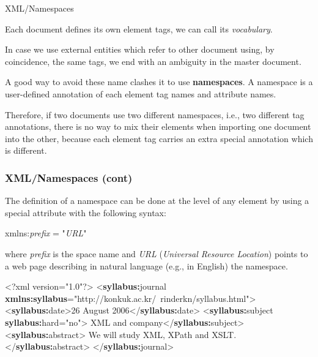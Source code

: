 %
\begin{frame}{XML/Namespaces}

Each \XML document defines its own element tags, we can call its
\emph{vocabulary}.

\bigskip

In case we use external entities which refer to other \XML document
using, by coincidence, the same tags, we end with an ambiguity in the
master document.

\bigskip

A good way to avoid these name clashes it to use
\textbf{namespaces}. A namespace is a user-defined annotation of each
element tag names and attribute names.

\bigskip

Therefore, if two \XML documents use two different namespaces, i.e.,
two different tag annotations, there is no way to mix their elements
when importing one document into the other, because each element tag
carries an extra special annotation which is different.

\end{frame}

%
\begin{frame}[containsverbatim]
\frametitle{XML/Namespaces (cont)}

The definition of a namespace can be done at the level of any element
by using a special attribute with the following syntax:
{\small
\begin{semiverbatim}
xmlns:\textit{prefix} = "\textit{URL}"
\end{semiverbatim}
}
where \emph{prefix} is the space name and \emph{URL} (\emph{Universal
  Resource Location}) points to a web page describing in natural
language (e.g., in English) the namespace.
{\small
\begin{semiverbatim}
<?xml version="1.0"?>
<\textbf{syllabus:}journal
 \textbf{xmlns:syllabus}="http://konkuk.ac.kr/~rinderkn/syllabus.html">
 <\textbf{syllabus:}date>26 August 2006</\textbf{syllabus:}date>
 <\textbf{syllabus:}subject \textbf{syllabus:}hard="no">
   XML and company</\textbf{syllabus:}subject>
 <\textbf{syllabus:}abstract>
   We will study XML, XPath and XSLT.</\textbf{syllabus:}abstract>
</\textbf{syllabus:}journal>
\end{semiverbatim}
}

\end{frame}

